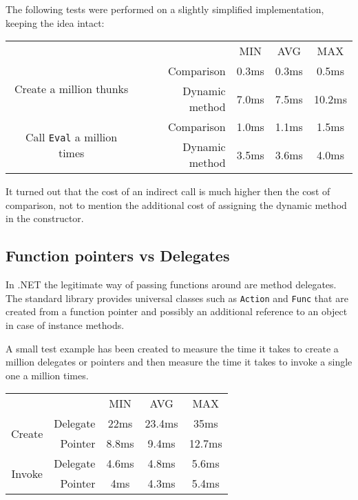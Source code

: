\documentclass[en]{pracamgr}
\begin{document}
The following tests were performed on a slightly simplified
implementation, keeping the idea intact:

\begin{center}
\begin{tabular}{c r c c c}
    & & MIN & AVG & MAX \\
    \cline{3-5}

    \multirow{2}{*}{Create a million thunks}
    & Comparison & 0.3ms & 0.3ms & 0.5ms \\
    & Dynamic method & 7.0ms & 7.5ms & 10.2ms \\
    \cline{2-5}

    \multirow{2}{*}{Call \texttt{Eval} a million times} 
    & Comparison & 1.0ms & 1.1ms & 1.5ms \\
    & Dynamic method & 3.5ms & 3.6ms & 4.0ms \\
    
\end{tabular}
\end{center}

It turned out that the cost of an indirect call is much higher then the cost of comparison, not to mention the additional cost of assigning the dynamic method in the constructor.

\subsection{Function pointers vs Delegates}\label{perf:fun_pointers}

In .NET the legitimate way of passing functions around
are method delegates. The standard library provides
universal classes such as \texttt{Action} and \texttt{Func}
that are created from a function pointer and possibly
an additional reference to an object in case of instance methods.

A small test example has been created to measure the time
it takes to create a million delegates or pointers and then
measure the time it takes to invoke a single one a million times.

\begin{center}
\begin{tabular}{c r c c c}
    & & MIN & AVG & MAX \\
    \cline{3-5}

    \multirow{2}{*}{Create}
    & Delegate & 22ms & 23.4ms & 35ms \\
    & Pointer & 8.8ms & 9.4ms & 12.7ms \\
    \cline{2-5}
    
    \multirow{2}{*}{Invoke}
    & Delegate & 4.6ms & 4.8ms & 5.6ms \\
    & Pointer & 4ms & 4.3ms & 5.4ms \\
\end{tabular}
\end{center}
\end{document}
